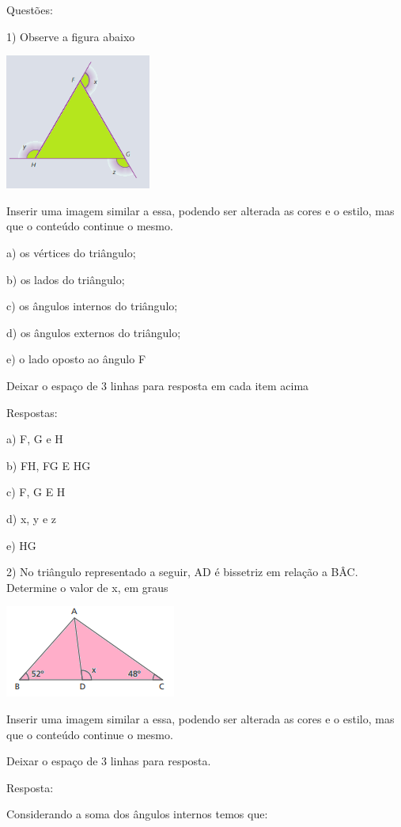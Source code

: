 Questões:

1) Observe a figura abaixo

\includegraphics[width=1.88333in,height=1.75048in]{./imgSAEB_8_MAT/media/image13.png}

Inserir uma imagem similar a essa, podendo ser alterada as cores e o
estilo, mas que o conteúdo continue o mesmo.

a) os vértices do triângulo;

b) os lados do triângulo;

c) os ângulos internos do triângulo;

d) os ângulos externos do triângulo;

e) o lado oposto ao ângulo F

Deixar o espaço de 3 linhas para resposta em cada item acima

Respostas:

a) F, G e H

b) FH, FG E HG

c) F, G E H

d) x, y e z

e) HG

2) No triângulo representado a seguir, AD é bissetriz em relação a BÂC.
Determine o valor de x, em graus

\includegraphics[width=2.20833in,height=1.1875in]{./imgSAEB_8_MAT/media/image14.png}

Inserir uma imagem similar a essa, podendo ser alterada as cores e o
estilo, mas que o conteúdo continue o mesmo.

Deixar o espaço de 3 linhas para resposta.

Resposta:

Considerando a soma dos ângulos internos temos que:

